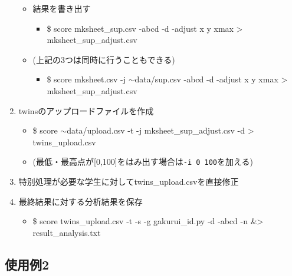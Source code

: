 \begin{enumerate}
\begin{itemize}
\begin{itemize}
\end{itemize}

\item 結果を書き出す

\begin{itemize}
\item \$ score mksheet\_sup.csv -abcd -d -adjust x y xmax > mksheet\_sup\_adjust.csv

\end{itemize}

\item (上記の3つは同時に行うこともできる)

\begin{itemize}
\item \$ score mksheet.csv -j \ensuremath{\sim}data\slash sup.csv -abcd -d -adjust x y xmax > mksheet\_sup\_adjust.csv

\end{itemize}

\end{itemize}

\item twinsのアップロードファイルを作成

\begin{itemize}
\item \$ score \ensuremath{\sim}data\slash upload.csv -t -j mksheet\_sup\_adjust.csv -d > twins\_upload.csv

\item (最低・最高点が{[0,100]}をはみ出す場合は\texttt{-i 0 100}を加える)

\end{itemize}

\item 特別処理が必要な学生に対してtwins\_upload.csvを直接修正

\item 最終結果に対する分析結果を保存

\begin{itemize}
\item \$ score twins\_upload.csv -t -s -g gakurui\_id.py -d -abcd -n \&> result\_analysis.txt

\end{itemize}

\end{enumerate}

\subsection{使用例2}
\label{使用例2}

